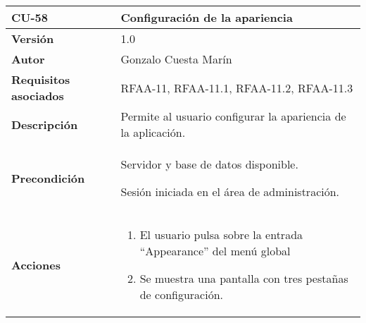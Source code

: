 \begin{longtable}[]{@{}ll@{}}
\toprule
\begin{minipage}[b]{0.22\columnwidth}\raggedright
\textbf{CU-58}\strut
\end{minipage} & \begin{minipage}[b]{0.72\columnwidth}\raggedright
\textbf{Configuración de la apariencia}\strut
\end{minipage}\tabularnewline
\midrule
\endhead
\begin{minipage}[t]{0.22\columnwidth}\raggedright
\textbf{Versión}\strut
\end{minipage} & \begin{minipage}[t]{0.72\columnwidth}\raggedright
1.0\strut
\end{minipage}\tabularnewline
\begin{minipage}[t]{0.22\columnwidth}\raggedright
\textbf{Autor}\strut
\end{minipage} & \begin{minipage}[t]{0.72\columnwidth}\raggedright
Gonzalo Cuesta Marín\strut
\end{minipage}\tabularnewline
\begin{minipage}[t]{0.22\columnwidth}\raggedright
\textbf{Requisitos asociados}\strut
\end{minipage} & \begin{minipage}[t]{0.72\columnwidth}\raggedright
RFAA-11, RFAA-11.1, RFAA-11.2, RFAA-11.3\strut
\end{minipage}\tabularnewline
\begin{minipage}[t]{0.22\columnwidth}\raggedright
\textbf{Descripción}\strut
\end{minipage} & \begin{minipage}[t]{0.72\columnwidth}\raggedright
Permite al usuario configurar la apariencia de la aplicación.\strut
\end{minipage}\tabularnewline
\begin{minipage}[t]{0.22\columnwidth}\raggedright
\textbf{Precondición}\strut
\end{minipage} & \begin{minipage}[t]{0.72\columnwidth}\raggedright
Servidor y base de datos disponible.

Sesión iniciada en el área de administración.\strut
\end{minipage}\tabularnewline
\begin{minipage}[t]{0.22\columnwidth}\raggedright
\textbf{Acciones}\strut
\end{minipage} & \begin{minipage}[t]{0.72\columnwidth}\raggedright
\begin{enumerate}
\def\labelenumi{\arabic{enumi}.}
\tightlist
\item
  El usuario pulsa sobre la entrada ``Appearance'' del menú global
\item
  Se muestra una pantalla con tres pestañas de configuración.


\end{enumerate}
\end{minipage}
\end{longtable}
